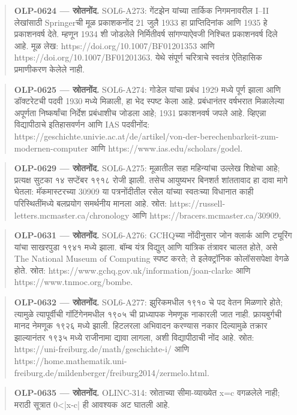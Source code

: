 \begin{quote}\small\textbf{OLP-0624 — स्रोतनोंद.} SOL6-A273: गेंटझेन यांच्या तार्किक निगमनावरील I–II लेखांसाठी Springerची मूळ प्रकाशकनोंद 21 जुलै 1933 हा प्राप्तिदिनांक आणि 1935 हे प्रकाशनवर्ष देते. म्हणून 1934 शी जोडलेले निर्मितीवर्ष सांगण्याऐवजी निश्चित प्रकाशनवर्ष दिले आहे. मूळ लेख: https://doi.org/10.1007/BF01201353 आणि https://doi.org/10.1007/BF01201363. येथे संपूर्ण चरित्राचे स्वतंत्र ऐतिहासिक प्रमाणीकरण केलेले नाही.\end{quote}
\begin{quote}\small\textbf{OLP-0625 — स्रोतनोंद.} SOL6-A274: गोडेल यांचा प्रबंध 1929 मध्ये पूर्ण झाला आणि डॉक्टरेटची पदवी 1930 मध्ये मिळाली, हा भेद स्पष्ट केला आहे. प्रबंधानंतर वर्षभरात मिळालेल्या अपूर्णता निष्कर्षांचा निर्देश प्रबंधाशीच जोडला आहे; 1931 प्रकाशनवर्ष जपले आहे. व्हिएन्ना विद्यापीठाचे इतिहासवर्णन आणि IAS पदवीनोंद: https://geschichte.univie.ac.at/de/artikel/von-der-berechenbarkeit-zum-modernen-computer आणि https://www.ias.edu/scholars/godel.\end{quote}
\begin{quote}\small\textbf{OLP-0629 — स्रोतनोंद.} SOL6-A275: मूळातील सहा महिन्यांचा उल्लेख शिक्षेचा आहे; प्रत्यक्ष सुटका १४ सप्टेंबर १९१८ रोजी झाली. तसेच आयुष्यभर बिनशर्त शांततावाद हा दावा मागे घेतला: मॅकमास्टरच्या 30909 या पत्रनोंदीतील रसेल यांच्या स्वतःच्या विधानात काही परिस्थितींमध्ये बलप्रयोग समर्थनीय मानला आहे. स्रोत: https://russell-letters.mcmaster.ca/chronology आणि https://bracers.mcmaster.ca/30909.\end{quote}
\begin{quote}\small\textbf{OLP-0631 — स्रोतनोंद.} SOL6-A276: GCHQच्या नोंदीनुसार जोन क्लार्क आणि ट्यूरिंग यांचा साखरपुडा १९४१ मध्ये झाला. बॉम्ब यंत्र विद्युत् आणि यांत्रिक तंत्रावर चालत होते, असे The National Museum of Computing स्पष्ट करते; ते इलेक्ट्रॉनिक कोलॉससपेक्षा वेगळे होते. स्रोत: https://www.gchq.gov.uk/information/joan-clarke आणि https://www.tnmoc.org/bombe.\end{quote}
\begin{quote}\small\textbf{OLP-0632 — स्रोतनोंद.} SOL6-A277: झुरिकमधील १९१० चे पद वेतन मिळणारे होते; त्यामुळे त्यापूर्वीची गॉटिंगेनमधील १९०५ ची प्राध्यापक नेमणूक नाकारली जात नाही. फ्रायबुर्गची मानद नेमणूक १९२६ मध्ये झाली. हिटलरला अभिवादन करण्यास नकार दिल्यामुळे तक्रार झाल्यानंतर १९३५ मध्ये राजीनामा द्यावा लागला, अशी विद्यापीठाची नोंद आहे. स्रोत: https://uni-freiburg.de/math/geschichte-i/ आणि https://home.mathematik.uni-freiburg.de/mildenberger/freiburg2014/zermelo.html.\end{quote}
\begin{quote}\small\textbf{OLP-0635 — स्रोतनोंद.} OLINC-314: स्रोताच्या सीमा-व्याख्येत x=c वगळलेले नाही; मराठी सूत्रात 0<|x-c| ही आवश्यक अट घातली आहे.\end{quote}
